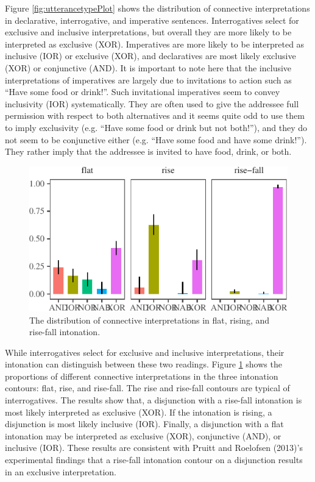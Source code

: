 \documentclass[floatsintext,man]{apa6}
\theoremstyle{definition}
\theoremstyle{definition}
\theoremstyle{definition}
\theoremstyle{remark}
\begin{document}
Figure \ref{fig:utterancetypePlot} shows the distribution of connective
interpretations in declarative, interrogative, and imperative sentences.
Interrogatives select for exclusive and inclusive interpretations, but
overall they are more likely to be interpreted as exclusive (XOR).
Imperatives are more likely to be interpreted as inclusive (IOR) or
exclusive (XOR), and declaratives are most likely exclusive (XOR) or
conjunctive (AND). It is important to note here that the inclusive
interpretations of imperatives are largely due to invitations to action
such as \enquote{Have some food or drink!}. Such invitational
imperatives seem to convey inclusivity (IOR) systematically. They are
often used to give the addressee full permission with respect to both
alternatives and it seems quite odd to use them to imply exclusivity
(e.g. \enquote{Have some food or drink but not both!}), and they do not
seem to be conjunctive either (e.g. \enquote{Have some food and have
some drink!}). They rather imply that the addressee is invited to have
food, drink, or both.

\begin{figure}[tb]

{\centering \includegraphics{figs/intonationPlot-1} 

}

\caption{The distribution of connective interpretations in flat, rising, and rise-fall intonation.}\label{fig:intonationPlot}
\end{figure}

While interrogatives select for exclusive and inclusive interpretations,
their intonation can distinguish between these two readings. Figure
\ref{fig:intonationPlot} shows the proportions of different connective
interpretations in the three intonation contours: flat, rise, and
rise-fall. The rise and rise-fall contours are typical of
interrogatives. The results show that, a disjunction with a rise-fall
intonation is most likely interpreted as exclusive (XOR). If the
intonation is rising, a disjunction is most likely inclusive (IOR).
Finally, a disjunction with a flat intonation may be interpreted as
exclusive (XOR), conjunctive (AND), or inclusive (IOR). These results
are consistent with Pruitt and Roelofsen (2013)'s experimental findings
that a rise-fall intonation contour on a disjunction results in an
exclusive interpretation.
\end{document}
